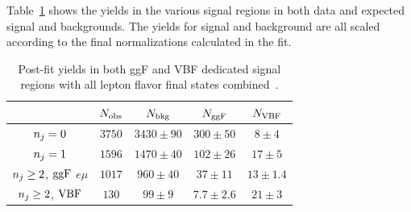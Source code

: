 Table~\ref{tab:final-yields} shows the yields in the various signal regions in both data and expected signal and backgrounds. The yields for signal and background are all scaled according to the final normalizations calculated in the fit. 

\begin{table}[h!]
\centering
\captionsetup{justification=centering}

\hspace{-10pt}
\begin{tabular}{|c|c|c|c|c|}
\hline
 & $N_{\rm obs}$ & $N_{\rm bkg}$ & $N_{\rm ggF}$ & $N_{\rm VBF}$ \\ \hline
$n_j = 0$ & $3750$ & $3430 \pm 90$ & $300 \pm 50$ & $8 \pm 4$ \\ \hline
$n_j = 1$ & $1596$ & $1470 \pm 40$ & $102 \pm 26$ & $17 \pm 5$ \\ \hline
$n_j \geq 2$, $\rm ggF$ $e\mu$ & $1017$ & $960 \pm 40$ & $37 \pm 11$ & $13 \pm 1.4$ \\ \hline
$n_j \geq 2$, $\rm VBF$ & $130$ & $99 \pm 9$ & $7.7 \pm 2.6$ & $21 \pm 3$ \\ \hline
\end{tabular}

\caption{
Post-fit yields in both ggF and VBF dedicated signal regions with all lepton flavor final states combined~\cite{WW2015}. 
}
\label{tab:final-yields}
\end{table}


